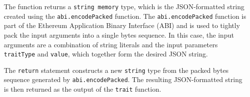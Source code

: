 The function returns a \texttt{string\ memory} type, which is the
JSON-formatted string created using the \texttt{abi.encodePacked}
function. The \texttt{abi.encodePacked} function is part of the Ethereum
Application Binary Interface (ABI) and is used to tightly pack the input
arguments into a single bytes sequence. In this case, the input
arguments are a combination of string literals and the input parameters
\texttt{traitType} and \texttt{value}, which together form the desired
JSON string.

The \texttt{return} statement constructs a new \texttt{string} type from
the packed bytes sequence generated by \texttt{abi.encodePacked}. The
resulting JSON-formatted string is then returned as the output of the
\texttt{trait} function.
